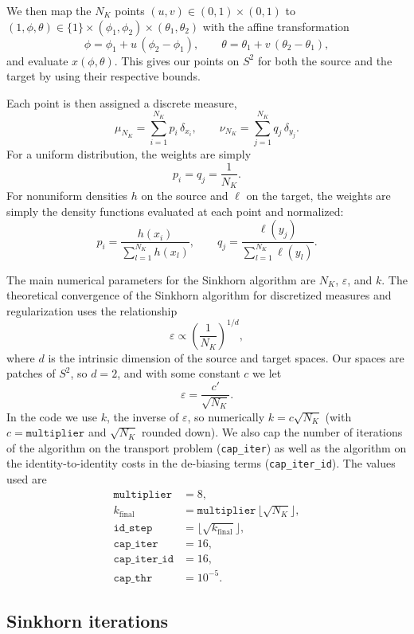 \documentclass{article}
\begin{document}
We then map the $N_K$ points $(u,v)\in(0,1)\times(0,1)$ to
$(1,\phi,\theta)\in\{1\}\times(\phi_1,\phi_2)\times(\theta_1,\theta_2)$ with the
affine transformation
\[
    \phi=\phi_1+u\,(\phi_2-\phi_1),
    \qquad
    \theta=\theta_1+v\,(\theta_2-\theta_1),
\]
and evaluate $x(\phi,\theta)$.  This gives our points on $S^2$ for both the source and the target by using their respective bounds.

Each point is then assigned a discrete measure,
\[
    \mu_{N_K}=\sum_{i=1}^{N_K}p_i\,\delta_{x_i},
    \qquad
    \nu_{N_K}=\sum_{j=1}^{N_K}q_j\,\delta_{y_j}.
\]
For a uniform distribution, the weights are simply
\[
    p_i=q_j=\frac{1}{N_K}.
\]
For nonuniform densities $h$ on the source and $\ell$ on the target, the weights
are simply the density functions evaluated at each point and normalized:
\[
    p_i=\frac{h(x_i)}{\sum_{l=1}^{N_K}h(x_l)},
    \qquad
    q_j=\frac{\ell(y_j)}{\sum_{l=1}^{N_K}\ell(y_l)}.
\]

The main numerical parameters for the Sinkhorn algorithm are $N_K$,
$\varepsilon$, and $k$.  The theoretical convergence of the Sinkhorn algorithm
for discretized measures and regularization uses the relationship
\[
    \varepsilon\propto\left(\frac{1}{N_K}\right)^{1/d},
\]
where $d$ is the intrinsic dimension of the source and target spaces.  Our
spaces are patches of $S^2$, so $d=2$, and with some constant $c$ we let
\[
    \varepsilon=\frac{c'}{\sqrt{N_K}}.
\]
In the code we use $k$, the inverse of $\varepsilon$, so numerically
$k=c\sqrt{N_K}$ (with $c=\texttt{multiplier}$ and $\sqrt{N_K}$ rounded down).
We also cap the number of iterations of the algorithm on the transport problem
(\texttt{cap\_iter}) as well as the algorithm on the identity-to-identity
costs in the de-biasing terms (\texttt{cap\_iter\_id}).  The values used are
\begin{align*}
    \texttt{multiplier} &= 8, \\
    k_{\mathrm{final}} &= \texttt{multiplier}\,\lfloor\sqrt{N_K}\rfloor, \\
    \texttt{id\_step} &= \lfloor\sqrt{k_{\mathrm{final}}}\rfloor, \\
    \texttt{cap\_iter} &= 16, \\
    \texttt{cap\_iter\_id} &= 16, \\
    \texttt{cap\_thr} &= 10^{-5}.
\end{align*}

\subsection{Sinkhorn iterations}
\end{document}
